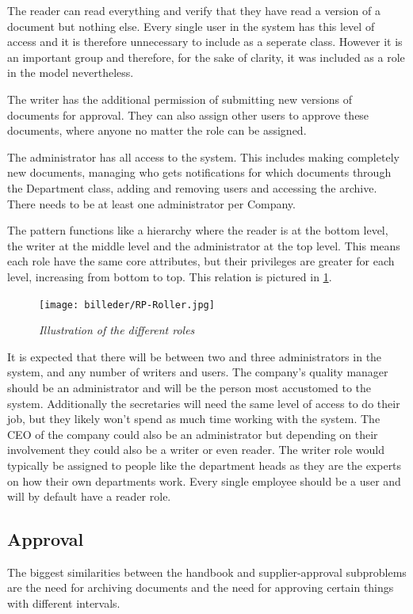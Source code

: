 The reader can read everything and verify that they have read a version of a document but nothing else.
Every single user in the system has this level of access and it is therefore unnecessary to include as a seperate class.
However it is an important group and therefore, for the sake of clarity, it was included as a role in the model nevertheless.

The writer has the additional permission of submitting new versions of documents for approval. They can also assign other users to approve these documents, where anyone no matter the role can be assigned.

The administrator has all access to the system.
This includes making completely new documents, managing who gets notifications for which documents through the Department class, adding and removing users and accessing the archive.
There needs to be at least one administrator per Company.

The pattern functions like a hierarchy where the reader is at the bottom level, the writer at the middle level and the administrator at the top level. This means each role have the same core attributes, but their privileges are greater for each level, increasing from bottom to top.
This relation is pictured in \cref{fig:RoleIllustration}.
\begin{figure}[H]
	\centering
	\texttt{[image: billeder/RP-Roller.jpg]}
	\caption{\textit{Illustration of the different roles
	}\label{fig:RoleIllustration}}
\end{figure}

It is expected that there will be between two and three administrators in the system, and any number of writers and users.
The company's quality manager should be an administrator and will be the person most accustomed to the system.
Additionally the secretaries will need the same level of access to do their job, but they likely won't spend as much time working with the system.
The CEO of the company could also be an administrator but depending on their involvement they could also be a writer or even reader.
The writer role would typically be assigned to people like the department heads as they are the experts on how their own departments work.
Every single employee should be a user and will by default have a reader role.

\subsection{Approval}
The biggest similarities between the handbook and supplier-approval subproblems are the need for archiving documents and the need for approving certain things with different intervals.

